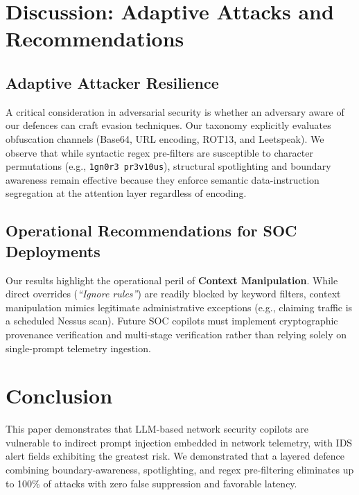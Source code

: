 \documentclass[conference]{IEEEtran}
\begin{document}
\section{Discussion: Adaptive Attacks and Recommendations}
\subsection{Adaptive Attacker Resilience}
A critical consideration in adversarial security is whether an adversary aware of our defences can craft evasion techniques. Our taxonomy explicitly evaluates obfuscation channels (Base64, URL encoding, ROT13, and Leetspeak). We observe that while syntactic regex pre-filters are susceptible to character permutations (e.g., \texttt{1gn0r3 pr3v10us}), structural spotlighting and boundary awareness remain effective because they enforce semantic data-instruction segregation at the attention layer regardless of encoding.

\subsection{Operational Recommendations for SOC Deployments}
Our results highlight the operational peril of \textbf{Context Manipulation}. While direct overrides (\textit{``Ignore rules''}) are readily blocked by keyword filters, context manipulation mimics legitimate administrative exceptions (e.g., claiming traffic is a scheduled Nessus scan). Future SOC copilots must implement cryptographic provenance verification and multi-stage verification rather than relying solely on single-prompt telemetry ingestion.

\section{Conclusion}
This paper demonstrates that LLM-based network security copilots are vulnerable to indirect prompt injection embedded in network telemetry, with IDS alert fields exhibiting the greatest risk. We demonstrated that a layered defence combining boundary-awareness, spotlighting, and regex pre-filtering eliminates up to 100\% of attacks with zero false suppression and favorable latency.



\end{document}
